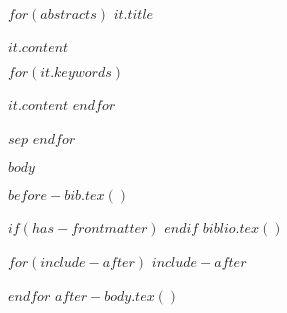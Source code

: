 $for(abstracts)$ 
\textbf{$it.title$} \\ \\
$it.content$

\begin{description}
  $for(it.keywords)$
  \item[$it.title$:] $it.content$
  $endfor$
\end{description}

$sep$ 
$endfor$







\newpage
{}
\setcounter{page}{1}


\fancyfoot[R]{\thepage}
$body$

$before-bib.tex()$

$if(has-frontmatter)$
\backmatter
$endif$
$biblio.tex()$

$for(include-after)$
$include-after$

$endfor$
$after-body.tex()$
